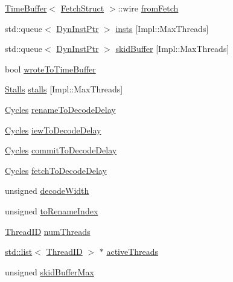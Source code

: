 \begin{DoxyCompactItemize}
\item 
\hyperlink{classTimeBuffer}{TimeBuffer}$<$ \hyperlink{classDefaultDecode_a3aac8607069f16898ef53cfaa2d97aeb}{FetchStruct} $>$::wire \hyperlink{classDefaultDecode_a2e3dd009c447d077f19b303b53b52fab}{fromFetch}
\item 
std::queue$<$ \hyperlink{classDefaultDecode_a028ce10889c5f6450239d9e9a7347976}{DynInstPtr} $>$ \hyperlink{classDefaultDecode_a1b0ce60f9b6c662a2f3df87a3e8b50f8}{insts} \mbox{[}Impl::MaxThreads\mbox{]}
\item 
std::queue$<$ \hyperlink{classDefaultDecode_a028ce10889c5f6450239d9e9a7347976}{DynInstPtr} $>$ \hyperlink{classDefaultDecode_a911bfd7c5c1efbd9f479d2b960078ec1}{skidBuffer} \mbox{[}Impl::MaxThreads\mbox{]}
\item 
bool \hyperlink{classDefaultDecode_a2c7e870d4babdac0dc91fc7ffabd0f3d}{wroteToTimeBuffer}
\item 
\hyperlink{structDefaultDecode_1_1Stalls}{Stalls} \hyperlink{classDefaultDecode_ade48cf321f5741ea8e54e071680cacdc}{stalls} \mbox{[}Impl::MaxThreads\mbox{]}
\item 
\hyperlink{classCycles}{Cycles} \hyperlink{classDefaultDecode_a3b9933c4d891d5618e6a103f0c231e8c}{renameToDecodeDelay}
\item 
\hyperlink{classCycles}{Cycles} \hyperlink{classDefaultDecode_ac7ece3c345b9ce038d4b7726da7c9b41}{iewToDecodeDelay}
\item 
\hyperlink{classCycles}{Cycles} \hyperlink{classDefaultDecode_a77f4b17f2ef6c226e894d648ee743fae}{commitToDecodeDelay}
\item 
\hyperlink{classCycles}{Cycles} \hyperlink{classDefaultDecode_a689484c3554224a1c1c676e9dde3f653}{fetchToDecodeDelay}
\item 
unsigned \hyperlink{classDefaultDecode_aecf92f13590eed742e3064a4fdb5e004}{decodeWidth}
\item 
unsigned \hyperlink{classDefaultDecode_a998ac27e2d5479a5c6e97258d25cea3d}{toRenameIndex}
\item 
\hyperlink{base_2types_8hh_ab39b1a4f9dad884694c7a74ed69e6a6b}{ThreadID} \hyperlink{classDefaultDecode_a88377f855dbf5adeeecb06b5bb821d35}{numThreads}
\item 
\hyperlink{classstd_1_1list}{std::list}$<$ \hyperlink{base_2types_8hh_ab39b1a4f9dad884694c7a74ed69e6a6b}{ThreadID} $>$ $\ast$ \hyperlink{classDefaultDecode_af6eaea53db532812052f71bf0380dab5}{activeThreads}
\item 
unsigned \hyperlink{classDefaultDecode_a268414a6444b620140f263013a739a17}{skidBufferMax}

\end{DoxyCompactItemize}
